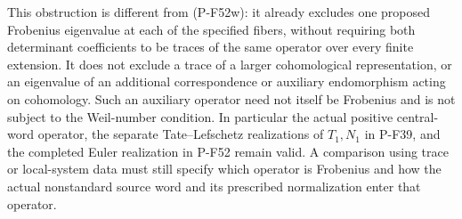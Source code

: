 This obstruction is different from (P-F52w): it already
excludes one proposed Frobenius eigenvalue at each of the
specified fibers, without requiring both determinant
coefficients to be traces of the same operator over every
finite extension.  It does not exclude a trace of a larger
cohomological representation, or an eigenvalue of an
additional correspondence or auxiliary endomorphism acting
on cohomology.  Such an auxiliary operator need not itself
be Frobenius and is not subject to the Weil-number condition.
In particular the actual positive central-word operator,
the separate Tate--Lefschetz realizations of $T_1,N_1$ in
P-F39, and the completed Euler realization in P-F52 remain
valid.  A comparison using trace or local-system data must
still specify which operator is Frobenius and how the
actual nonstandard source word and its prescribed
normalization enter that operator.
